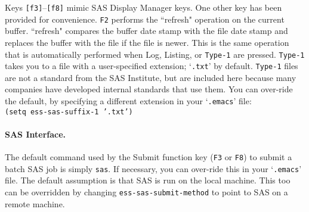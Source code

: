 \documentclass{article}
\newcommand{\stexttt}[1]{{\small\texttt{#1}}}
\newcommand{\elcode}[1]{\\{\stexttt{\hspace*{2em} #1}}\\}
\newenvironment{Salltt}{\small\begin{alltt}}{\end{alltt}}
\newcommand{\file}[1]{`\stexttt{#1}'}
\begin{document}
Keys \stexttt{[f3]}--\stexttt{[f8]} mimic SAS Display Manager keys.
One other key has been provided for convenience.  \stexttt{F2}
performs the ``refresh" operation on the current buffer.  ``refresh"
compares the buffer date stamp with the file date stamp and replaces
the buffer with the file if the file is newer.  This is the same
operation that is automatically performed when Log, Listing, or
\stexttt{Type-1} are pressed.  \stexttt{Type-1} takes you to a file
with a user-specified extension; \file{.txt} by default.
\stexttt{Type-1} files are not a standard from the SAS Institute, but
are included here because many companies have developed internal
standards that use them.  You can over-ride the default, by specifying
a different extension in your \file{.emacs} file:\\
\stexttt{(setq ess-sas-suffix-1 '.txt')}

\paragraph{SAS Interface.}
\label{sec:SAS:interface}

The default command used by the Submit function key
(\stexttt{F3} or \stexttt{F8}) to
submit a batch SAS job is simply \stexttt{sas}.  If necessary, you can
over-ride this in your \file{.emacs} file.
The default assumption is that SAS is run on the local machine.  This too
can be overridden by changing \stexttt{ess-sas-submit-method} to point to
SAS on a remote machine.

\end{document}
